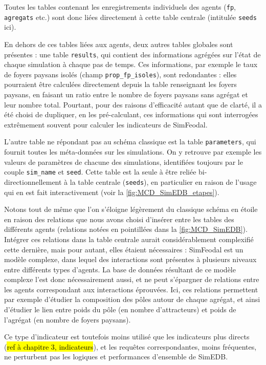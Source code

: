		Toutes les tables contenant les enregistrements individuels des agents (\texttt{fp}, \texttt{agregats} etc.) sont donc liées directement à cette table centrale (intitulée \texttt{seeds} ici).
			
		En dehors de ces tables liées aux agents, deux autres tables \og globales\fg{} sont présentes : une table \og \texttt{results}\fg{}, qui contient des informations agrégées sur l'état de chaque simulation à chaque pas de temps. Ces informations, par exemple le taux de foyers paysans isolés (champ \og \texttt{prop\_fp\_isoles}\fg{}), sont redondantes : elles pourraient être calculées directement depuis la table renseignant les foyers paysans, en faisant un ratio entre le nombre de foyers paysans sans agrégat et leur nombre total.
		Pourtant, pour des raisons d'efficacité autant que de clarté, il a été choisi de dupliquer, en les pré-calculant, ces informations qui sont interrogées extrêmement souvent pour calculer les indicateurs de SimFeodal.
			
		L'autre table ne répondant pas au schéma classique est la table \og \texttt{parameters}\fg{}, qui fournit toutes les méta-données sur les simulations. On y retrouve par exemple les valeurs de paramètres de chacune des simulations, identifiées toujours par le couple \texttt{sim\_name} et \texttt{seed}.
		Cette table est la seule à être reliée bi-directionnellement à la table centrale (\texttt{seeds}), en particulier en raison de l'usage qui en est fait interactivement (voir la \cref{fig:MCD_SimEDB_etapes}).
		
		Notons tout de même que l'on s'éloigne légèrement du classique schéma en étoile en raison des relations que nous avons choisi d'insérer entre les tables des différents agents (relations notées en pointillées dans la \cref{fig:MCD_SimEDB}).
		Intégrer ces relations dans la table centrale aurait considérablement complexifié cette dernière, mais pour autant, elles étaient nécessaires : SimFeodal est un modèle complexe, dans lequel des interactions sont présentes à plusieurs niveaux entre différents types d'agents. La base de données résultant de ce modèle complexe l'est donc nécessairement aussi, et ne peut s'épargner de relations entre les agents correspondant aux interactions éprouvées.
		Ici, ces relations permettent par exemple d'étudier la composition des pôles autour de chaque agrégat, et ainsi d'étudier le lien entre poids du pôle (en nombre d'attracteurs) et poids de l'agrégat (en nombre de foyers paysans).
		
		Ce type d'indicateur est toutefois moins utilisé que les indicateurs plus directs (\hl{ref à chapitre 3, indicateurs}), et les requêtes correspondantes, moins fréquentes, ne perturbent pas les logiques et performances d'ensemble de SimEDB.
			

